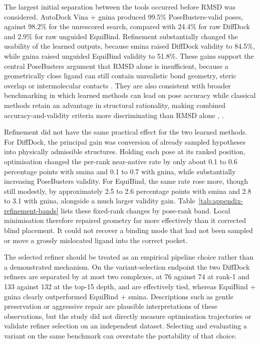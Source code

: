 The largest initial separation between the tools occurred before RMSD was considered. AutoDock Vina + gnina produced 99.5\% PoseBusters-valid poses, against 98.2\% for the unrescored search, compared with 24.4\% for raw DiffDock and 2.9\% for raw unguided EquiBind. Refinement substantially changed the usability of the learned outputs, because smina raised DiffDock validity to 84.5\%, while gnina raised unguided EquiBind validity to 51.8\%. These gains support the central PoseBusters argument that RMSD alone is insufficient, because a geometrically close ligand can still contain unrealistic bond geometry, steric overlap or intermolecular contacts \cite{ref035}. They are also consistent with broader benchmarking in which learned methods can lead on pose accuracy while classical methods retain an advantage in structural rationality, making combined accuracy-and-validity criteria more discriminating than RMSD alone \cite{ref013}, \cite{ref032}.

Refinement did not have the same practical effect for the two learned methods. For DiffDock, the principal gain was conversion of already sampled hypotheses into physically admissible structures. Holding each pose at its ranked position, optimisation changed the per-rank near-native rate by only about 0.1 to 0.6 percentage points with smina and 0.1 to 0.7 with gnina, while substantially increasing PoseBusters validity. For EquiBind, the same rate rose more, though still modestly, by approximately 2.5 to 2.6 percentage points with smina and 2.8 to 3.1 with gnina, alongside a much larger validity gain. Table~\ref{tab:appendix-refinement-bands} lists these fixed-rank changes by pose-rank band. Local minimisation therefore repaired geometry far more effectively than it corrected blind placement. It could not recover a binding mode that had not been sampled or move a grossly mislocated ligand into the correct pocket.

The selected refiner should be treated as an empirical pipeline choice rather than a demonstrated mechanism. On the variant-selection endpoint the two DiffDock refiners are separated by at most two complexes, at 76 against 74 at rank-1 and 133 against 132 at the top-15 depth, and are effectively tied, whereas EquiBind + gnina clearly outperformed EquiBind + smina. Descriptions such as gentle preservation or aggressive repair are plausible interpretations of these observations, but the study did not directly measure optimisation trajectories or validate refiner selection on an independent dataset. Selecting and evaluating a variant on the same benchmark can overstate the portability of that choice.

